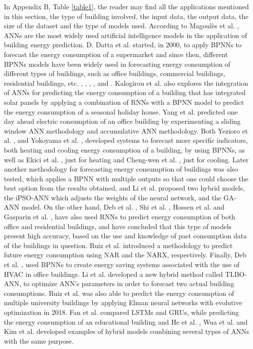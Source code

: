 In Appendix B, Table \ref{table1}, the reader may find all the applications mentioned in this section, the type of building involved, the input data, the output data, the size of the dataset and the type of models used. According to Magoulès et al. \cite{ann1}, \ac{ANNs} are the most widely used artificial intelligence models in the application of building energy prediction. D. Datta et al. \cite{annr1} started, in 2000, to apply \ac{BPNN}s to forecast the energy consumption of a supermarket and since then, different \ac{BPNN}s models have been widely used in forecasting energy consumption of different types of buildings, such as office buildings, commercial buildings, residential buildings, etc. \cite{annr4}, \cite{annr9}, \cite{annr13}, \cite{annr14}, \cite{annr17} and \cite{annr19}. Kalogirou et al. \cite{annr2} also explores the integration of \ac{ANN}s for predicting the energy consumption of a building that has integrated solar panels by applying a combination of \ac{RNN}s with a \ac{BPNN} model to predict the energy consumption of a seasonal holiday house. Yang et al. \cite{annr3} predicted one day ahead electric consumption of an office building by experimenting a sliding window \ac{ANN} methodology and accumulative \ac{ANN} methodology. Both Yezioro et al. \cite{annr5}, and Yokoyama et al. \cite{annr7}, developed systems to forecast more specific indicators, both heating and cooling energy consumption of a building, by using \ac{BPNN}s, as well as Ekici et al. \cite{annr6}, just for heating and Cheng-wen et al. \cite{annr8}, just for cooling. Later another methodology for forecasting energy consumption of buildings was also tested, which applies a \ac{BPNN} with multiple outputs \cite{annr10} so that one could choose the best option from the results obtained, and Li et al. \cite{annr12} proposed two hybrid models, the \ac{iPSO-ANN} which adjusts the weights of the neural network, and the \ac{GA-ANN} model.
On the other hand, Deb et al. \cite{annr15}, Shi et al. \cite{annr16}, Hossen et al. \cite{annr18} and Gasparin et al. \cite{annr21},  have also used \ac{RNN}s to predict energy consumption of both office and residential buildings, and have concluded that this type of models present high accuracy, based on the use and knowledge of past consumption data of the buildings in question. Ruiz et al. \cite{annr22} introduced a methodology to predict future energy consumption using \ac{NAR} and the \ac{NARX}, respectively.
Finally, Deb et al. \cite{annr20}, used \ac{BPNN}s to create energy saving systems associated with the use of \ac{HVAC} in office buildings.
Li et al. \cite{annr24} developed a new hybrid method called \ac{TLBO-ANN}, to optimize \ac{ANN}’s parameters in order to forecast two actual building consumptions. Ruiz et al. \cite{annr25} was also able to predict the energy consumption of multiple university buildings by applying Elman neural networks with evolutive optimization in 2018. Fan et al. \cite{annr26} compared \ac{LSTM}s and \ac{GRU}s, while predicting the energy consumption of an educational building and He et al. \cite{annr27}, Wua et al. \cite{annr28} and Kim et al. \cite{annr29} developed examples of hybrid models combining several types of \ac{ANN}s with the same purpose. 


